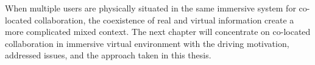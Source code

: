 When multiple users are physically situated in the same immersive system for co-located collaboration, the coexistence of real and virtual information create a more complicated mixed context. The next chapter will concentrate on co-located collaboration in immersive virtual environment with the driving motivation, addressed issues, and the approach taken in this thesis.
